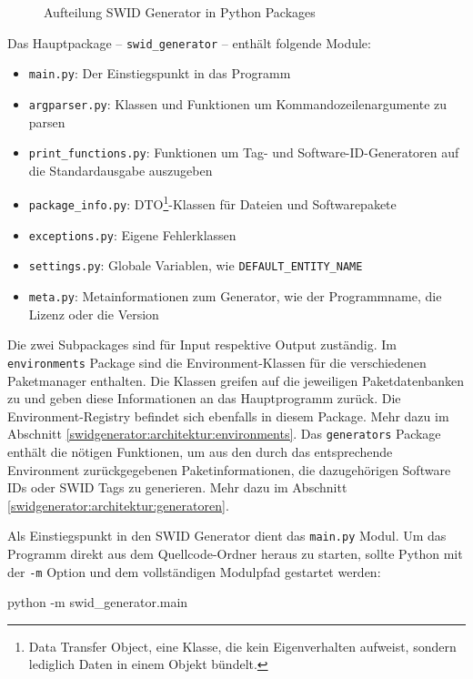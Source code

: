 \begin{figure}[H]
	\centering
	
	\caption{Aufteilung SWID Generator in Python Packages}
\end{figure}

Das Hauptpackage -- \texttt{swid\_generator} -- enthält folgende Module:

\begin{itemize}
	\item \texttt{main.py}: Der Einstiegspunkt in das Programm
	\item \texttt{argparser.py}: Klassen und Funktionen um
		Kommandozeilenargumente zu parsen
	\item \texttt{print\_functions.py}: Funktionen um Tag- und
		Software-ID-Generatoren auf die Standardausgabe auszugeben
	\item \texttt{package\_info.py}: DTO\footnote{Data Transfer Object, eine
		Klasse, die kein Eigenverhalten aufweist, sondern lediglich Daten in
		einem Objekt bündelt.}-Klassen für Dateien und Softwarepakete
	\item \texttt{exceptions.py}: Eigene Fehlerklassen
	\item \texttt{settings.py}: Globale Variablen, wie \zb
		\texttt{DEFAULT\_ENTITY\_NAME}
	\item \texttt{meta.py}: Metainformationen zum Generator, wie \zb der
		Programmname, die Lizenz oder die Version
\end{itemize}

Die zwei Subpackages sind für Input respektive Output zuständig. Im
\texttt{environments} Package sind die Environment-Klassen für die verschiedenen
Paketmanager enthalten. Die Klassen greifen auf die jeweiligen Paketdatenbanken
zu und geben diese Informationen an das Hauptprogramm zurück. Die
Environment-Registry befindet sich ebenfalls in diesem Package. Mehr dazu im
Abschnitt \ref{swidgenerator:architektur:environments}. Das \texttt{generators}
Package enthält die nötigen Funktionen, um aus den durch das entsprechende
Environment zurückgegebenen Paketinformationen, die dazugehörigen Software IDs
oder SWID Tags zu generieren. Mehr dazu im Abschnitt
\ref{swidgenerator:architektur:generatoren}.

Als Einstiegspunkt in den SWID Generator dient das \texttt{main.py} Modul. Um
das Programm direkt aus dem Quellcode-Ordner heraus zu starten, sollte Python
mit der \texttt{-m} Option und dem vollständigen Modulpfad gestartet werden:

\begin{bashcode}
python -m swid_generator.main
\end{bashcode}

